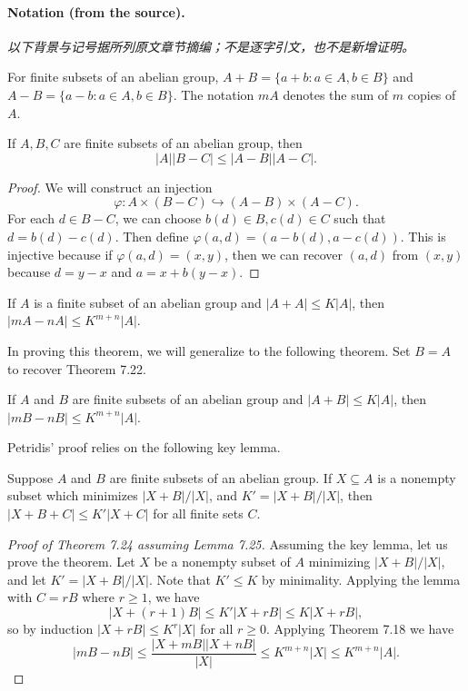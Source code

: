 \paragraph{Notation (from the source).}
\noindent\textit{以下背景与记号据所列原文章节摘编；不是逐字引文，也不是新增证明。}\par For finite subsets of an abelian group, $A+B=\{a+b:a\in A,b\in B\}$ and $A-B=\{a-b:a\in A,b\in B\}$. The notation $mA$ denotes the sum of $m$ copies of $A$.
\begin{theorem}
If $A,B,C$ are finite subsets of an abelian group, then
\[|A||B-C|\leq |A-B||A-C|.\]
\end{theorem}
\begin{proof}
We will construct an injection
\[\varphi:A\times(B-C)\hookrightarrow(A-B)\times(A-C).\]
For each $d\in B-C$, we can choose $b(d)\in B,c(d)\in C$ such that $d=b(d)-c(d)$. Then define $\varphi(a,d)=(a-b(d),a-c(d))$. This is injective because if $\varphi(a,d)=(x,y)$, then we can recover $(a,d)$ from $(x,y)$ because $d=y-x$ and $a=x+b(y-x)$.
\end{proof}
\begin{theorem}
If $A$ is a finite subset of an abelian group and $|A+A|\leq K|A|$, then $|mA-nA|\leq K^{m+n}|A|$.
\end{theorem}
In proving this theorem, we will generalize to the following theorem. Set $B=A$ to recover Theorem 7.22.
\begin{theorem}[7.24]
If $A$ and $B$ are finite subsets of an abelian group and $|A+B|\leq K|A|$, then $|mB-nB|\leq K^{m+n}|A|$.
\end{theorem}
Petridis' proof relies on the following key lemma.
\begin{lemma}[7.25]
Suppose $A$ and $B$ are finite subsets of an abelian group. If $X\subseteq A$ is a nonempty subset which minimizes $|X+B|/|X|$, and $K'=|X+B|/|X|$, then $|X+B+C|\leq K'|X+C|$ for all finite sets $C$.
\end{lemma}
\begin{proof}[Proof of Theorem 7.24 assuming Lemma 7.25]
Assuming the key lemma, let us prove the theorem. Let $X$ be a nonempty subset of $A$ minimizing $|X+B|/|X|$, and let $K'=|X+B|/|X|$. Note that $K'\leq K$ by minimality. Applying the lemma with $C=rB$ where $r\geq1$, we have
\[|X+(r+1)B|\leq K'|X+rB|\leq K|X+rB|,\]
so by induction $|X+rB|\leq K^r|X|$ for all $r\geq0$. Applying Theorem 7.18 we have
\[|mB-nB|\leq\frac{|X+mB||X+nB|}{|X|}\leq K^{m+n}|X|\leq K^{m+n}|A|.\]
\end{proof}
